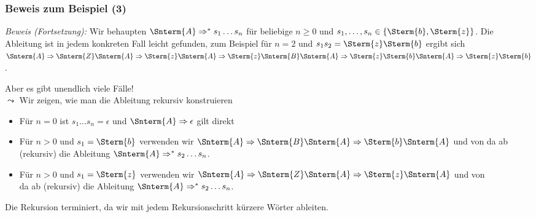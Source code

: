 \documentclass[aspectratio=1610,onlymath]{beamer}
\begin{document}
\begin{frame}\frametitle{Beweis zum Beispiel (3)}

%
\bigskip

\emph{Beweis (Fortsetzung):} Wir behaupten $\Snterm{A}\Rightarrow^* s_1 \ldots s_n$ für beliebige $n\geq 0$ und $s_1,\ldots,s_n\in \{\Sterm{b},\Sterm{z}\}$.
Die Ableitung ist in jedem konkreten Fall leicht gefunden, zum Beispiel für
$n=2$ und $s_1s_2=\Sterm{z}\Sterm{b}$ ergibt sich
$\Snterm{A}\Rightarrow \Snterm{Z}\Snterm{A}\Rightarrow\Sterm{z}\Snterm{A}\Rightarrow \Sterm{z}\Snterm{B}\Snterm{A}
\Rightarrow \Sterm{z}\Sterm{b}\Snterm{A}\Rightarrow \Sterm{z}\Sterm{b}$.
\bigskip\pause

Aber es gibt unendlich viele Fälle!\\\pause
$\leadsto$ Wir zeigen, wie man die Ableitung rekursiv konstruieren \pause
% 
\begin{itemize}
\item Für $n=0$ ist $s_1 \ldots s_n=\epsilon$ und $\Snterm{A}\Rightarrow\epsilon$ gilt direkt\pause
\item Für $n>0$ und $s_1=\Sterm{b}$ verwenden wir $\Snterm{A}\Rightarrow \Snterm{B}\Snterm{A}\Rightarrow\Sterm{b}\Snterm{A}$ und von da ab (rekursiv) die Ableitung
$\Snterm{A}\Rightarrow^* s_2 \ldots s_n$.\pause
\item Für $n>0$ und $s_1=\Sterm{z}$ verwenden wir $\Snterm{A}\Rightarrow \Snterm{Z}\Snterm{A}\Rightarrow\Sterm{z}\Snterm{A}$ und von\\da ab (rekursiv) die Ableitung
$\Snterm{A}\Rightarrow^* s_2 \ldots s_n$.\pause
\end{itemize}
Die Rekursion terminiert, da wir mit jedem Rekursionschritt kürzere Wörter ableiten.

\end{frame}
\end{document}
